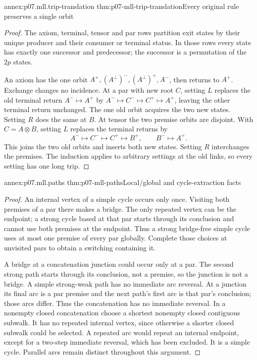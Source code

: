 \begin{annexitem}{annex:p07.mll.trip-translation}
 {thm:p07-mll-trip-translation}{Every original rule preserves a single orbit}
\begin{proof}
The axiom, terminal, tensor and par rows partition exit states by their
unique producer and their consumer or terminal status. In those rows
every state has exactly one successor and predecessor; the successor
is a permutation of the \(2p\) states.

An axiom has the one orbit
\(A^+,(A^\perp)^-,(A^\perp)^+,A^-\), then returns to \(A^+\).
Exchange changes no incidence. At a par with new root \(C\), setting
\(L\) replaces the old terminal return \(A^-\mapsto A^+\) by
\(A^-\mapsto C^-\mapsto C^+\mapsto A^+\), leaving the other
terminal return unchanged. The one old orbit acquires the two new states.
Setting \(R\) does the same at \(B\).
At tensor the two premise orbits are disjoint. With \(C=A\otimes B\),
setting \(L\) replaces the terminal returns by
\[
 A^-\mapsto C^-\mapsto C^+\mapsto B^+,\qquad B^-\mapsto A^+.
\]
This joins the two old orbits and inserts both new states. Setting \(R\)
interchanges the premises. The induction applies to arbitrary settings
at the old links, so every setting has one long trip.
\end{proof}
\end{annexitem}

\begin{annexitem}{annex:p07.mll.paths}
 {thm:p07-mll-paths}{Local/global and cycle-extraction facts}
\begin{proof}
An internal vertex of a simple cycle occurs only once. Visiting both
premises of a par there makes a bridge. The only repeated vertex can
be the endpoint; a strong cycle based at that par starts through its
conclusion and cannot use both premises at the endpoint. Thus a strong
bridge-free simple cycle uses at most one premise of every par globally.
Complete those choices at unvisited pars to obtain a switching containing it.

A bridge at a concatenation junction could occur only at a par.
The second strong path starts through its conclusion, not a premise,
so the junction is not a bridge.
A simple strong-weak path has no immediate arc reversal. At a junction
its final arc is a par premise and the next path's first arc is that
par's conclusion; those arcs differ. Thus the concatenation has no
immediate reversal. In a nonempty closed concatenation choose a shortest
nonempty closed contiguous subwalk. It has no repeated internal vertex,
since otherwise a shorter closed subwalk could be selected. A repeated
arc would repeat an internal endpoint, except for a two-step immediate
reversal, which has been excluded. It is a simple cycle.
Parallel arcs remain distinct throughout this argument.
\end{proof}
\end{annexitem}


